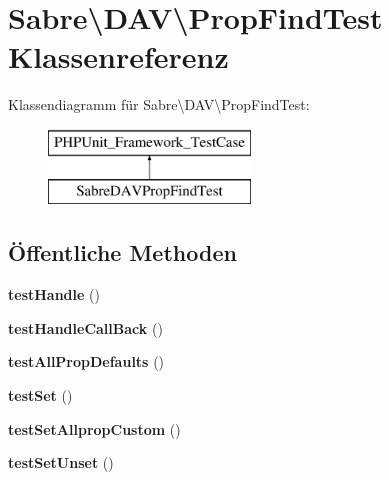 \hypertarget{class_sabre_1_1_d_a_v_1_1_prop_find_test}{}\section{Sabre\textbackslash{}D\+AV\textbackslash{}Prop\+Find\+Test Klassenreferenz}
\label{class_sabre_1_1_d_a_v_1_1_prop_find_test}
Klassendiagramm für Sabre\textbackslash{}D\+AV\textbackslash{}Prop\+Find\+Test\+:\begin{figure}[H]
\begin{center}
\leavevmode
\includegraphics[height=2.000000cm]{class_sabre_1_1_d_a_v_1_1_prop_find_test}
\end{center}
\end{figure}
\subsection*{Öffentliche Methoden}
\begin{DoxyCompactItemize}
\item 
\mbox{\label{class_sabre_1_1_d_a_v_1_1_prop_find_test_ad6a9678d9d904c9c9900cb55d8cc4287}} 
{\bfseries test\+Handle} ()
\item 
\mbox{\label{class_sabre_1_1_d_a_v_1_1_prop_find_test_aaf8bc6dcf9718ad999475cee76a8ee56}} 
{\bfseries test\+Handle\+Call\+Back} ()
\item 
\mbox{\label{class_sabre_1_1_d_a_v_1_1_prop_find_test_af9d2ee0538f16f7bde0ce031136435dd}} 
{\bfseries test\+All\+Prop\+Defaults} ()
\item 
\mbox{\label{class_sabre_1_1_d_a_v_1_1_prop_find_test_a6a6184a323f85c53a9e55b3fd526ac19}} 
{\bfseries test\+Set} ()
\item 
\mbox{\label{class_sabre_1_1_d_a_v_1_1_prop_find_test_a09622284de8d07a488283aec39b3728d}} 
{\bfseries test\+Set\+Allprop\+Custom} ()
\item 
\mbox{\label{class_sabre_1_1_d_a_v_1_1_prop_find_test_a0cbe8ebbf3736c5943ba7d2adaafb1db}} 
{\bfseries test\+Set\+Unset} ()
\end{DoxyCompactItemize}


